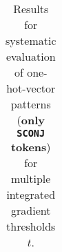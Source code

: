 \begin{table}[t]
\begin{tabular}{lllllll}

\hline
\end{tabular}
\caption[Model Evaluation for only \texttt{SCONJ} tokens]{Results for systematic evaluation of one-hot-vector patterns (\textbf{only \texttt{SCONJ} tokens}) for multiple integrated gradient thresholds $t$.}
\label{tab:evalResultsSCONJ}
\end{table}
	